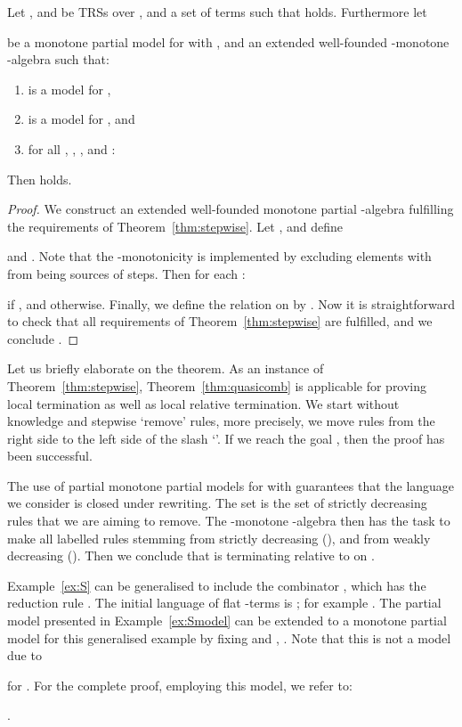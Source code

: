 \begin{theorem}\label{thm:quasicomb}
  Let ,  and  
  be TRSs over , and  a set of terms such that
   holds.
  Furthermore let 
  
  be a monotone partial model for  with ,
  and 
  an extended well-founded -monotone -algebra
  such that:
  \begin{enumerate}[\em(1)]
   \item  is a model for ,
\item  is a model for , and
\item for all , , , and :
        
  \end{enumerate}
  Then  holds.
\end{theorem}
\begin{proof}We construct an
  extended well-founded monotone partial
  -algebra 
  fulfilling the requirements of Theorem~\ref{thm:stepwise}.
  Let ,
  and define 
  
  and
  .
  Note that the -monotonicity is implemented
  by excluding elements  with  from being sources of  steps.
  Then for each :
  
  if , and  otherwise.
  Finally, we define the relation  on  by 
  .
  Now it is straightforward to check that all requirements of Theorem~\ref{thm:stepwise}
  are fulfilled, and we conclude .
\end{proof}

Let us briefly elaborate on the theorem.
As an instance of Theorem~\ref{thm:stepwise}, Theorem~\ref{thm:quasicomb}
is applicable for proving local termination as well as local relative termination.
We start without knowledge  and stepwise `remove' rules,
more precisely, we move rules from the right side to the left side of the slash `'.
If we reach the goal , 
then the proof has been successful.

The use of partial monotone partial models for  
with 
guarantees that the language we consider is closed under rewriting.
The set  is the set of strictly decreasing rules that we are aiming to remove.
The -monotone -algebra 
then has the task to make all labelled rules stemming from  strictly decreasing (),
and from  weakly decreasing ().
Then we conclude that  is terminating relative to 
 on .

\begin{example}
\label{ex:SK}
Example~\ref{ex:S} can be generalised 
to include the combinator ,
which has the reduction rule .
The initial language of flat -terms is ; 
for example .
The partial model presented in Example~\ref{ex:Smodel}
can be extended to a monotone partial model for this generalised example 
by fixing 
and , .
Note that this is not a model due to
 
for .
For the complete proof, employing this model, we refer to: \begin{center}
.
\end{center}
\end{example}



